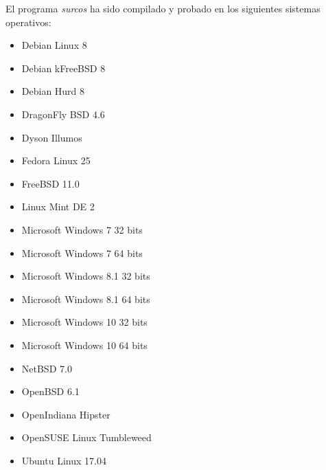 El programa \emph{surcos} ha sido compilado y probado en los siguientes sistemas
operativos:
\begin{itemize}
\item Debian Linux 8
\item Debian kFreeBSD 8
\item Debian Hurd 8
\item DragonFly BSD 4.6
\item Dyson Illumos
\item Fedora Linux 25
\item FreeBSD 11.0
\item Linux Mint DE 2
\item Microsoft Windows 7 32 bits
\item Microsoft Windows 7 64 bits
\item Microsoft Windows 8.1 32 bits
\item Microsoft Windows 8.1 64 bits
\item Microsoft Windows 10 32 bits
\item Microsoft Windows 10 64 bits
\item NetBSD 7.0
\item OpenBSD 6.1
\item OpenIndiana Hipster
\item OpenSUSE Linux Tumbleweed
\item Ubuntu Linux 17.04
\end{itemize}
